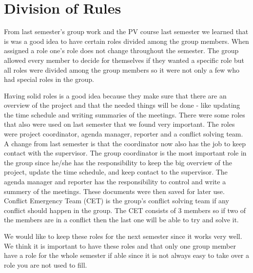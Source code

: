 \section{Division of Rules}
From last semester's group work and the PV course last semester we learned that is was a good idea to have certain roles divided among the group members. When assigned a role one's role does not change throughout the semester. The group allowed every member to decide for themselves if they wanted a specific role but all roles were divided among the group members so it were not only a few who had special roles in the group.

Having solid roles is a good idea because they make sure that there are an overview of the project and that the needed things will be done - like updating the time schedule and writing summaries of the meetings.
There were some roles that also were used on last semester that we found very important. The roles were project coordinator, agenda manager, reporter and a conflict solving team. A change from last semester is that the coordinator now also has the job to keep contact with the supervisor.
The group coordinator is the most important role in the group since he/she has the responsibility to keep the big overview of the project, update the time schedule, and keep contact to the supervisor.
The agenda manager and reporter has the responsibility to control and write a summery of the meetings. These documents were then saved for later use. Conflict Emergency Team (CET) is the group's conflict solving team if any conflict should happen in the group. The CET consists of 3 members so if two of the members are in a conflict then the last one will be able to try and solve it.

We would like to keep these roles for the next semester since it works very well. We think it is important to have these roles and that only one group member have a role for the whole semester if able since it is not always easy to take over a role you are not used to fill.
